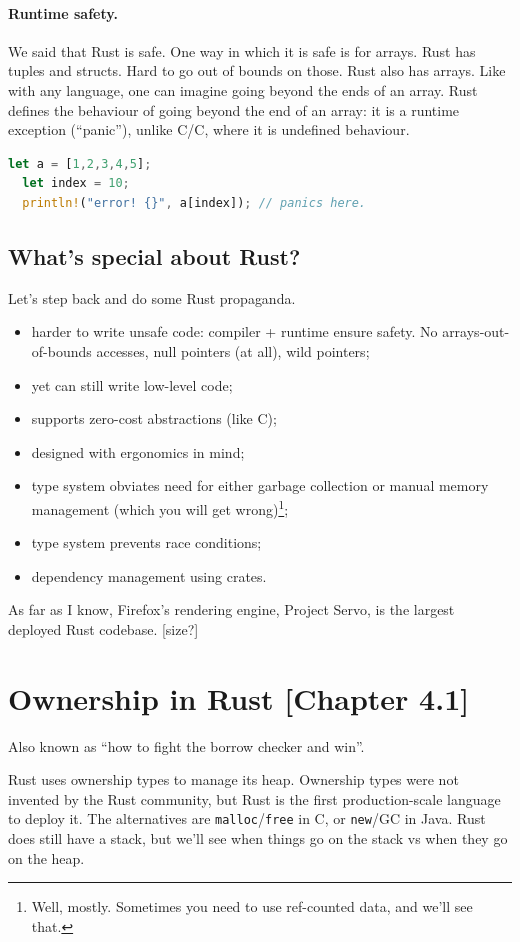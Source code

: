 \documentclass[a4paper]{report}
\newcommand{\CPP}{C\nolinebreak\hspace{-.05em}\raisebox{.4ex}{\tiny\bf +}\nolinebreak\hspace{-.10em}\raisebox{.4ex}{\tiny\bf +}}
\def\CPP{{C\nolinebreak[4]\hspace{-.05em}\raisebox{.4ex}{\tiny\bf ++}}}
\begin{document}
\paragraph{Runtime safety.} We said that Rust is safe. One way in which it is safe is for
arrays. Rust has tuples and structs. Hard to go out of bounds on those. Rust also has arrays.
Like with any language, one can imagine going beyond the ends of an array. Rust defines
the behaviour of going beyond the end of an array: it is a runtime exception (``panic''),
unlike C/\CPP, where it is undefined behaviour.


\begin{lstlisting}[language=Rust]
  let a = [1,2,3,4,5];
  let index = 10;
  println!("error! {}", a[index]); // panics here.
\end{lstlisting}

\subsection*{What's special about Rust?}
Let's step back and do some Rust propaganda.
\begin{itemize}[noitemsep]
\item harder to write unsafe code: compiler + runtime ensure safety. No arrays-out-of-bounds accesses, null pointers (at all), wild pointers;
\item yet can still write low-level code;
\item supports zero-cost abstractions (like \CPP);
\item designed with ergonomics in mind;
\item type system obviates need for either garbage collection or manual memory management (which you will get wrong)\footnote{Well, mostly. Sometimes you need to use ref-counted data, and we'll see that.};
\item type system prevents race conditions;
\item dependency management using crates.
\end{itemize}
As far as I know, Firefox's rendering engine, Project Servo, is the largest deployed Rust codebase. [size?]


\section*{Ownership in Rust [Chapter 4.1]}
Also known as ``how to fight the borrow checker and win''.

Rust uses ownership types to manage its heap. Ownership types were not invented by the Rust
community, but Rust is the first production-scale language to deploy it. The alternatives
are {\tt malloc}/{\tt free} in C, or {\tt new}/GC in Java. Rust does still have a stack, but
we'll see when things go on the stack vs when they go on the heap.
\end{document}
